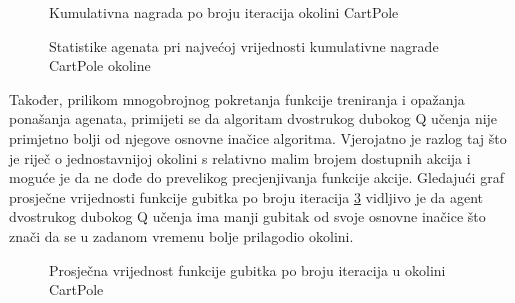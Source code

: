\begin{figure}[H]
    \centering
    \caption{Kumulativna nagrada po broju iteracija okolini CartPole}
    \label{fig:cartpole-cumulative-reward}
\end{figure}

\begin{figure}[H]
    \centering
    \caption{Statistike agenata pri najvećoj vrijednosti kumulativne nagrade CartPole okoline}
    \label{fig:cartpole-stats}
\end{figure}

Također, prilikom mnogobrojnog pokretanja funkcije treniranja i opažanja ponašanja agenata, primijeti se da algoritam dvostrukog dubokog Q učenja nije primjetno bolji od njegove osnovne inačice algoritma. Vjerojatno je razlog taj što je riječ o jednostavnijoj okolini s relativno malim brojem dostupnih akcija i moguće je da ne dođe do prevelikog precjenjivanja funkcije akcije. Gledajući graf prosječne vrijednosti funkcije gubitka po broju iteracija \ref{fig:cartpole-loss} vidljivo je da agent dvostrukog dubokog Q učenja ima manji gubitak od svoje osnovne inačice što znači da se u zadanom vremenu bolje prilagodio okolini.

\begin{figure}[H]
    \centering
    \caption{Prosječna vrijednost funkcije gubitka po broju iteracija u okolini CartPole}
    \label{fig:cartpole-loss}
\end{figure}

